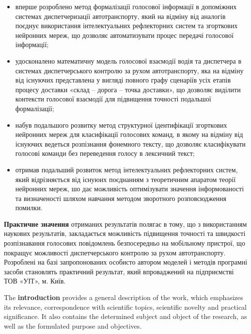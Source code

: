 \begin{itemize}
	\item вперше розроблено метод формалізації голосової інформації в допоміжних системах диспетчеризації автотранспорту, який на відміну від аналогів поєднує використання інтелектуальних рефлекторних систем та згорткових нейронних мереж, що дозволяє автоматизувати процес передачі голосової інформації;
	\item удосконалено математичну модель голосової взаємодії водія та диспетчера в системах диспетчерського контролю за рухом автотранспорту, яка на відміну від існуючих представлена у вигляді повного графу сценаріїв усіх етапів процесу доставки «склад – дорога – точка доставки», що дозволяє виділити контексти голосової взаємодії для підвищення точності подальшої формалізації;
	\item набув подальшого розвитку метод структурної ідентифікації згорткових нейронних мереж для класифікації голосових команд, в якому на відміну від існуючих ведеться розпізнання фонемного тексту, що дозволяє класифікувати голосові команди без переведення голосу в лексичний текст;
	\item отримав подальший розвиток метод інтелектуальних рефлекторних систем, який відрізняється від існуюих поєднанням з теоретичним апаратом теорії нейронних мереж, шо дає можливість оптимізувати значення інформованості та визначеності шляхом навчання методом зворотного розповсюдження помилки.
\end{itemize}

\textbf{Практичне значення} отриманих результатів полягає в тому, що з використанням наукових результатів, закладається можливість підвищення точності та швидкості розпізнавання голосових повідомлень безпосередньо на мобільному пристрої, що покращує можливості диспетчерського контролю за рухом автотранспорту. Розроблені на базі запропонованих особисто автором моделей і методів програмні засоби становлять практичний результат, який впроваджений на підприємстві ТОВ «УІТ», м. Київ.

The \textbf{introduction} provides a general description of the work, which emphasizes its relevance, correspondence with scientific topics, scientific novelty and practical significance. It also contains the determined subject and object of the research, as well as the formulated purpose and objectives.

